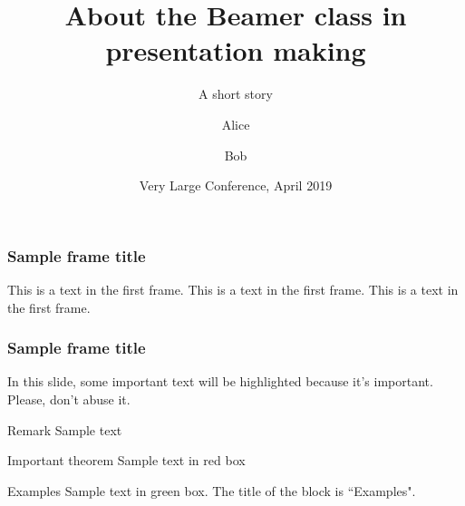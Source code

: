 \documentclass{beamer}
\title[About Beamer] %
{About the Beamer class in presentation making}
\subtitle{A short story}
\author[Alice, Bob] %
{Alice\inst{1} \and Bob\inst{2}}
\institute[SUSTech] %
{
  \inst{1}%
  Faculty of Physics\\
  Southern University of Science and Technology
  \and
  \inst{2}%
  Faculty of Chemistry\\
  Southern University of Science and Technology
}
\date[VLC 2019] %
{Very Large Conference, April 2019}
\begin{document}
 
\frame{\titlepage}
 
\begin{frame}
\frametitle{Sample frame title}
This is a text in the first frame. This is a text in the first frame. This is a text in the first frame.
\end{frame}

\begin{frame}
	\frametitle{Sample frame title}
	 
	In this slide, some important text will be
	\alert{highlighted} because it's important.
	Please, don't abuse it.
	 
	\begin{block}{Remark}
	Sample text
	\end{block}
	 
	\begin{alertblock}{Important theorem}
	Sample text in red box
	\end{alertblock}
	 
	\begin{exampleblock}{Examples}
	Sample text in green box. The title of the block is ``Examples".
	\end{exampleblock}
\end{frame}
 
\end{document}
